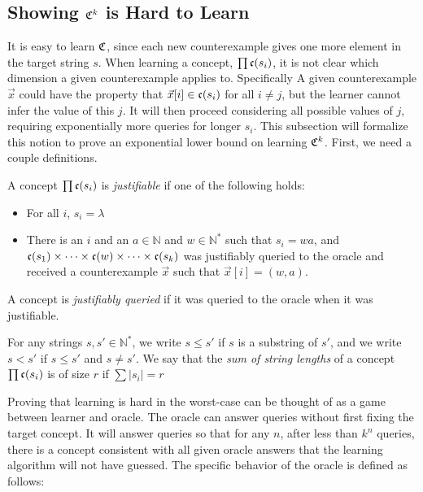 \subsection{Showing $\mathfrak{C}^k$ is Hard to Learn}

It is easy to learn $\mathfrak{C}$, since each new counterexample gives one more element in the target string $s$. 
When learning a concept, $\prod \mathfrak{c}(s_i)$, it is not clear which dimension a given counterexample applies to. 
Specifically A given counterexample $\vec{x}$ could have the property that $\vec{x}[i] \in \mathfrak{c}(s_i)$ for all $i \ne j$, but the learner cannot infer the value of this $j$. 
It will then proceed considering all possible values of $j$, requiring exponentially more queries for longer $s_i$.  
This subsection will formalize this notion to prove an exponential lower bound on learning $\mathfrak{C}^k$. 
First, we need a couple definitions. 


A concept $\prod \mathfrak{c}(s_i)$ is \emph{justifiable} if one of the following holds:
\begin{itemize}
\item For all $i$, $s_i = \lambda$
\item There is an $i$ and an $a \in \mathbb{N}$ and $w \in \mathbb{N}^*$ such that $s_i = wa$, and $\mathfrak{c}(s_1) \times \dots \times \mathfrak{c}(w) \times \dots \times \mathfrak{c}(s_k)$  was justifiably queried to the oracle and received a counterexample $\vec{x}$ such that $\vec{x}[i] = (w, a)$. 
\end{itemize}

A concept is \emph{justifiably queried} if it was queried to the oracle when it was justifiable. 
\newline

For any strings $s,s' \in \mathbb{N}^*$, we write $s \le s'$ if $s$ is a substring of $s'$, and we write $s < s'$ if $s \le s'$ and $s \ne s'$.
We say that the \emph{sum of string lengths} of a concept $\prod \mathfrak{c}(s_i)$ is of size $r$ if $\sum |s_i| = r$

Proving that learning is hard in the worst-case can be thought of as a game between learner and oracle. 
The oracle can answer queries without first fixing the target concept. 
It will answer queries so that for any $n$, after less than $k^n$ queries, there is a concept consistent with all given oracle answers that the learning algorithm will not have guessed. 
The specific behavior of the oracle is defined as follows:

